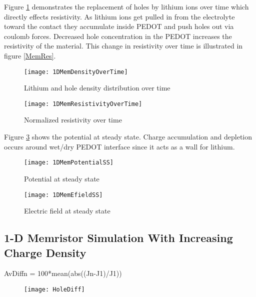{Figure \ref{MempLi} demonstrates the replacement of holes by lithium ions over time which directly effects resistivity. As lithium ions get pulled in from the electrolyte toward the contact they accumulate inside PEDOT and push holes out via coulomb forces. Decreased hole concentration in the PEDOT increases the resistivity of the material. This change in resistivity over time is illustrated in figure \ref{MemRes}.

\begin{landscape}
\begin{figure}[!htp]
\centering
\texttt{[image: 1DMemDensityOverTime]}
\caption{Lithium and hole density distribution over time} 
\label{MempLi}
\end{figure}
\end{landscape}

\begin{landscape}
\begin{figure}[!htp]
\centering
\texttt{[image: 1DMemResistivityOverTime]}
\caption{Normalized resistivity over time} 
\label{}
\end{figure}
\end{landscape}

Figure \ref{MemVss} shows the potential at steady state. Charge accumulation and depletion occurs around wet/dry PEDOT interface since it acts as a wall for lithium.  

\begin{figure}[!htp]
\centering
\texttt{[image: 1DMemPotentialSS]}
\caption{Potential at steady state} 
\label{MemVss}
\end{figure}

\begin{figure}[!htp]
\centering
\texttt{[image: 1DMemEfieldSS]}
\caption{Electric field at steady state} 
\label{MemEss}
\end{figure}

\clearpage
\subsection{1-D Memristor Simulation With Increasing Charge Density}

AvDiffn = 100*mean(abs((Jn-J1)/J1))

\begin{figure}[!htp]
\centering
\texttt{[image: HoleDiff]}
\caption{} 
\label{}
\end{figure}

}

